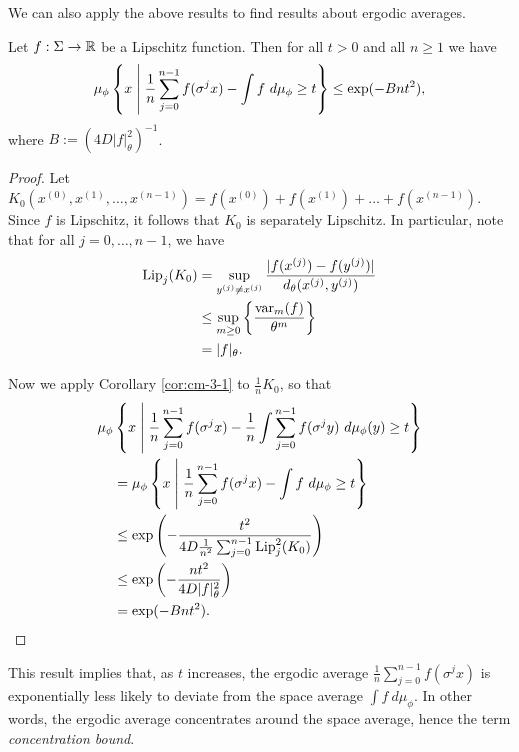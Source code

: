 We can also apply the above results to find results about ergodic averages.

\begin{corollary}\label{cor:cm-3-3}
	Let $f : \Sigma \to \mathbb{R}$ be a Lipschitz function. Then for all $t > 0$ and all $n \geq 1$ we have
	\begin{equation}
		\mu_\phi\left\{x \mathrel{}\middle|\mathrel{} \frac{1}{n}\sum_{j = 0}^{n - 1}{f(\sigma^j{x})} - \int{f\ d\mu_\phi} \geq t\right\} \leq \exp(-Bnt^2),
	\end{equation}
	where $B := (4D|f|_\theta^2)^{-1}$.
	\begin{proof}
		Let $K_0(x^{(0)}, x^{(1)}, \dots, x^{(n - 1)}) = f(x^{(0)}) + f(x^{(1)}) + \dots + f(x^{(n - 1)})$. Since $f$ is Lipschitz, it follows that $K_0$ is separately Lipschitz. In particular, note that for all $j = 0, \dots, n - 1$, we have
		\begin{align*}
			\operatorname{Lip}_j(K_0) &= \sup_{y^{(j)} \neq x^{(j)}}{\frac{|f(x^{(j)}) - f(y^{(j)})|}{d_\theta(x^{(j)}, y^{(j)})}} \\
				&\leq \sup_{m \geq 0}\left\{\frac{\operatorname{var}_m(f)}{\theta^m}\right\} \\
				&= |f|_\theta.
		\end{align*}
		
		Now we apply Corollary \ref{cor:cm-3-1} to $\frac{1}{n}K_0$, so that
		\begin{align*}
			\mu_\phi&\left\{x \mathrel{}\middle|\mathrel{} \frac{1}{n}\sum_{j = 0}^{n - 1}{f(\sigma^j{x})} - \frac{1}{n}\int{\sum_{j = 0}^{n - 1}{f(\sigma^j{y})}\ d\mu_\phi(y)} \geq t\right\} \\
			&=\mu_\phi\left\{x \mathrel{}\middle|\mathrel{} \frac{1}{n}\sum_{j = 0}^{n - 1}{f(\sigma^j{x})} - \int{f\ d\mu_\phi} \geq t\right\} \\
			&\leq \exp\left(-\frac{t^2}{4D\frac{1}{n^2}\sum_{j = 0}^{n - 1}{\operatorname{Lip}_j^2(K_0)}}\right) \\
			&\leq \exp\left(-\frac{nt^2}{4D|f|_\theta^2}\right) \\
			&= \exp(-Bnt^2).
		\end{align*}
	\end{proof}
\end{corollary}

This result implies that, as $t$ increases, the ergodic average $\frac{1}{n}\sum_{j = 0}^{n - 1}{f(\sigma^j{x})}$ is exponentially less likely to deviate from the space average $\int{f\ d\mu_\phi}$. In other words, the ergodic average concentrates around the space average, hence the term \emph{concentration bound}.

